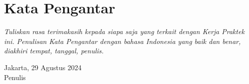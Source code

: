 \chapter*{Kata Pengantar}
\textit{Tuliskan rasa terimakasih kepada siapa saja yang terkait dengan Kerja Praktek ini. Penulisan Kata Pengantar dengan bahasa Indonesia yang baik dan benar, diakhiri tempat, tanggal, penulis.
}

\vspace{10em}
\hspace*{20em} Jakarta, 29 Agustus 2024\\
\hspace*{21.5em} Penulis